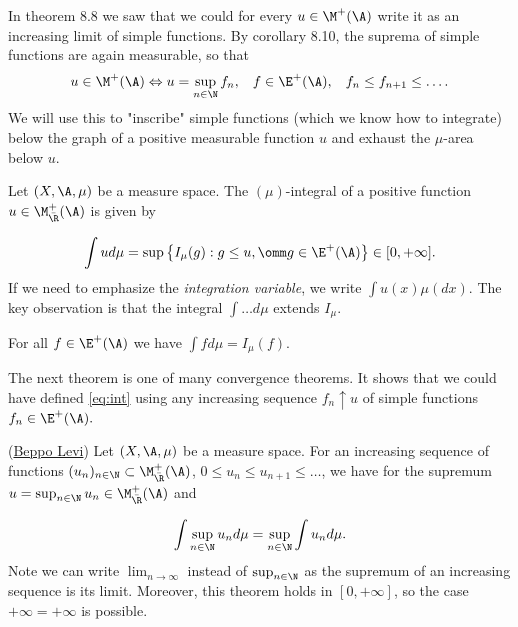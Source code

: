 In theorem 8.8 we saw that we could for every $u\in\M^+(\A)$ write it as an increasing limit
of simple functions. By corollary 8.10, the suprema of simple functions are again measurable, so that 
\begin{align*}
    u\in\M^+(\A)\Leftrightarrow u=\sup_{n\in\N} f_n,\hspace{3mm} f\in\E^+(\A),\hspace{3mm} f_n\leq f_{n+1}\leq\ldots.
\end{align*}
We will use this to "inscribe" simple functions (which we know how to integrate) below the graph of a 
positive measurable function $u$ and exhaust the $\mu$-area below $u$.
\begin{definition}
    Let $(X,\A,\mu)$ be a measure space. The $(\mu)$-integral of a positive function $u\in\M_{\bar\R}^+(\A)$ is given by 

    \begin{equation}
        \label{eq:int}
        \int ud\mu=\sup\left\{ I_\mu(g):g\leq u,\omm g\in\E^+(\A) \right\}\in[0,+\infty].
    \end{equation}
    If we need to emphasize the \textit{integration variable}, we write $\int u(x)\mu(dx).$
    The key observation is that the integral $\int\ldots d\mu$ extends $I_\mu.$

\end{definition}
\begin{lemma}
    For all $f\in\E^+(\A)$ we have $\int fd\mu = I_\mu(f).$
\end{lemma}

The next theorem is one of many convergence theorems. It shows that we could have defined \ref*{eq:int} using any increasing
sequence $f_n\uparrow u$ of simple functions $f_n\in\E^+(\A).$

\begin{theorem}(\underline{Beppo Levi})
    Let $(X,\A,\mu)$ be a measure space. For an increasing sequence of functions 
    $(u_n)_{n\in\N}\subset \M_{\bar\R}^+(\A)$, $0\leq u_n\leq u_{n+1}\leq\ldots$, we have for the supremum $u=\sup_{n\in\N} u_n\in\M_{\bar\R}^+(\A)$
    and 

    \begin{align}
        \int \sup_{n\in\N} u_nd\mu =\sup_{n\in\N} \int  u_nd\mu.
    \end{align}
Note we can write $\lim_{n\rightarrow \infty}$ instead of $\sup_{n\in\N}$ as the supremum of an increasing sequence
is its limit. Moreover, this theorem holds in $[0,+\infty]$, so the case $+\infty = +\infty$ is possible. 
\end{theorem}

